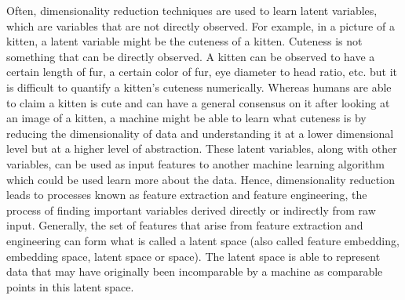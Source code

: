 Often, dimensionality reduction techniques are used to learn latent variables, which  are variables that are not directly observed. For example, in a picture of a kitten, a latent variable might be the cuteness of a kitten. Cuteness is not something that can be directly observed. A kitten can be observed to have a certain length of fur, a certain color of fur, eye diameter to head ratio, etc. but it is difficult to quantify a kitten's cuteness numerically. Whereas humans are able to claim a kitten is cute and can have a general consensus on it after looking at an image of a kitten, a machine might be able to learn what cuteness is by reducing the dimensionality of data and understanding it at a lower dimensional level but at a higher level of abstraction. These latent variables, along with other variables, can be used as input features to another machine learning algorithm which could be used learn more about the data. Hence, dimensionality reduction leads to processes known as feature extraction and feature engineering, the process of finding important variables derived directly or indirectly from raw input. Generally, the set of features that arise from feature extraction and engineering can form what is called a latent space (also called feature embedding, embedding space, latent space or space). The latent space is able to represent data that may have originally been incomparable by a machine as comparable points in this latent space. 



